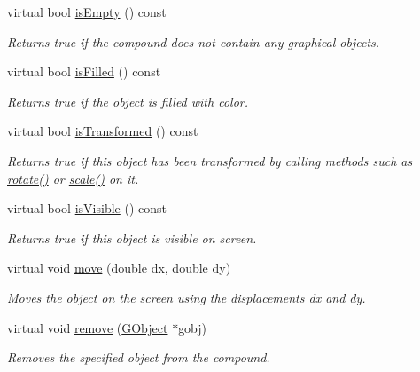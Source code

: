 \begin{DoxyCompactItemize}
virtual bool \mbox{\hyperlink{classsgl_1_1GCompound_acf82f9b2937375c7b1cf3dccb3df3312}{is\+Empty}} () const
\begin{DoxyCompactList}\small\item\em Returns true if the compound does not contain any graphical objects. \end{DoxyCompactList}\item 
virtual bool \mbox{\hyperlink{classsgl_1_1GObject_a11c404f106940c201b6f326e0355c150}{is\+Filled}} () const
\begin{DoxyCompactList}\small\item\em Returns {\ttfamily true} if the object is filled with color. \end{DoxyCompactList}\item 
virtual bool \mbox{\hyperlink{classsgl_1_1GObject_a9de207581cfa4ca1eaa06da5f29b75fc}{is\+Transformed}} () const
\begin{DoxyCompactList}\small\item\em Returns {\ttfamily true} if this object has been transformed by calling methods such as \mbox{\hyperlink{classsgl_1_1GObject_ae1ffaa12185dfd5ba464f7d87c329e26}{rotate()}} or \mbox{\hyperlink{classsgl_1_1GObject_ad2e1900f730475c2d044817db03b38d6}{scale()}} on it. \end{DoxyCompactList}\item 
virtual bool \mbox{\hyperlink{classsgl_1_1GObject_a9d8a6cfb13917785c143e74d40e4e2be}{is\+Visible}} () const
\begin{DoxyCompactList}\small\item\em Returns {\ttfamily true} if this object is visible on screen. \end{DoxyCompactList}\item 
virtual void \mbox{\hyperlink{classsgl_1_1GObject_a5973d8dda83afb36e2c56855515be392}{move}} (double dx, double dy)
\begin{DoxyCompactList}\small\item\em Moves the object on the screen using the displacements {\ttfamily dx} and {\ttfamily dy}. \end{DoxyCompactList}\item 
virtual void \mbox{\hyperlink{classsgl_1_1GCompound_a49dc57a2ce4caa354a5fff6acdde2e7d}{remove}} (\mbox{\hyperlink{classsgl_1_1GObject}{G\+Object}} $\ast$gobj)
\begin{DoxyCompactList}\small\item\em Removes the specified object from the compound. \end{DoxyCompactList}\item 

\end{DoxyCompactItemize}
